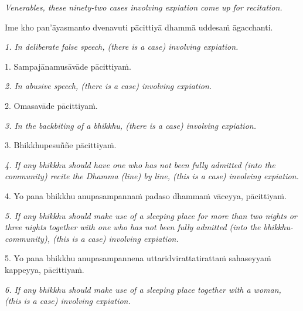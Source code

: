 \documentclass[11pt]{article}
\begin{document}
\begin{paracol}{2}
\begin{column}
{\itshape\footnotesize
Venerables, these ninety-two cases involving expiation come up for recitation.
}
\switchcolumn

\begin{flushleft}
Ime kho pan’āyasmanto dvenavuti pācittiyā dhammā uddesaṁ āgacchanti.
\switchcolumn*
\end{flushleft}

{\itshape\footnotesize
1. In deliberate false speech, (there is a case) involving expiation.
}
\switchcolumn

\begin{flushleft}
1. Sampajānamusāvāde pācittiyaṁ.
\switchcolumn*
\end{flushleft}

{\itshape\footnotesize
2. In abusive speech, (there is a case) involving expiation.
}
\switchcolumn

\begin{flushleft}
2. Omasavāde pācittiyaṁ.
\switchcolumn*
\end{flushleft}

{\itshape\footnotesize
3. In the backbiting of a bhikkhu, (there is a case) involving expiation.
}
\switchcolumn

\begin{flushleft}
3. Bhikkhupesuññe pācittiyaṁ.
\switchcolumn*
\end{flushleft}

{\itshape\footnotesize
4. If any bhikkhu should have one who has not been fully admitted (into the community) recite the Dhamma (line) by line, (this is a case) involving expiation.
}
\switchcolumn

\begin{flushleft}
4. Yo pana bhikkhu anupasampannaṁ padaso dhammaṁ vāceyya, pācittiyaṁ.
\switchcolumn*
\end{flushleft}

{\itshape\footnotesize
5. If any bhikkhu should make use of a sleeping place for more than two nights or three nights together with one who has not been fully admitted (into the bhikkhu-community), (this is a case) involving expiation.
}
\switchcolumn

\begin{flushleft}
5. Yo pana bhikkhu anupasampannena uttaridvirattatirattaṁ sahaseyyaṁ kappeyya, pācittiyaṁ.
\switchcolumn*
\end{flushleft}

{\itshape\footnotesize
6. If any bhikkhu should make use of a sleeping place together with a woman, (this is a case) involving expiation.
}
\switchcolumn


\end{column}
\end{paracol}
\end{document}
